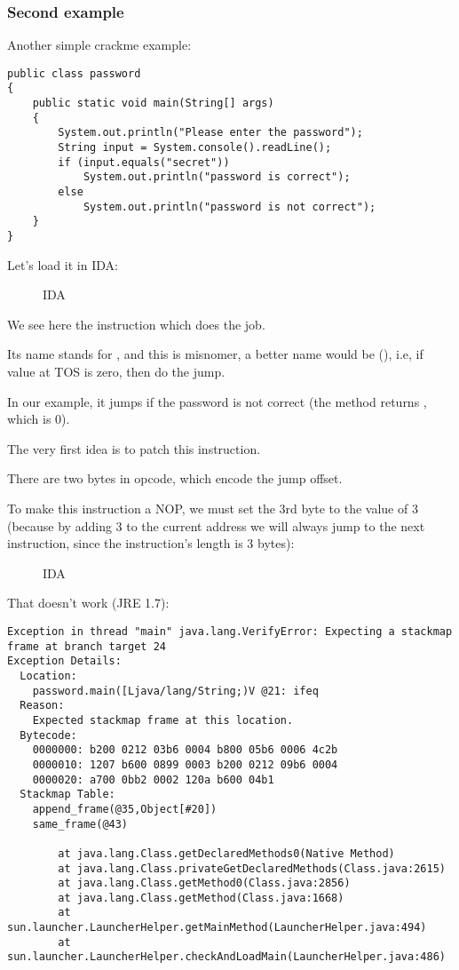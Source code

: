 \subsubsection{Second example}

Another simple crackme example:

\begin{lstlisting}
public class password
{
	public static void main(String[] args)
	{
		System.out.println("Please enter the password");
		String input = System.console().readLine();
		if (input.equals("secret"))
			System.out.println("password is correct");
		else
			System.out.println("password is not correct");
	}
}
\end{lstlisting}

Let's load it in IDA:

\begin{figure}[H]
\centering
{}
\caption{IDA}
\end{figure}

We see here the  instruction which does the job.

Its name stands for , and this is misnomer, a better name would be  (), i.e, 
if value at \ac{TOS} is zero, then do the jump.

In our example, it jumps if the password is not correct 
(the  method returns , which is 0).

The very first idea is to patch this instruction.

There are two bytes in  opcode, which encode the jump offset.

To make this instruction a NOP, we must set the 3rd byte to the value of 3 
(because by adding 3 to the current address we will always jump to the next instruction,
since the  instruction's length is 3 bytes):


\begin{figure}[H]
\centering
{}
\caption{IDA}
\end{figure}

That doesn't work (JRE 1.7):

\begin{lstlisting}
Exception in thread "main" java.lang.VerifyError: Expecting a stackmap frame at branch target 24
Exception Details:
  Location:
    password.main([Ljava/lang/String;)V @21: ifeq
  Reason:
    Expected stackmap frame at this location.
  Bytecode:
    0000000: b200 0212 03b6 0004 b800 05b6 0006 4c2b
    0000010: 1207 b600 0899 0003 b200 0212 09b6 0004
    0000020: a700 0bb2 0002 120a b600 04b1
  Stackmap Table:
    append_frame(@35,Object[#20])
    same_frame(@43)

        at java.lang.Class.getDeclaredMethods0(Native Method)
        at java.lang.Class.privateGetDeclaredMethods(Class.java:2615)
        at java.lang.Class.getMethod0(Class.java:2856)
        at java.lang.Class.getMethod(Class.java:1668)
        at sun.launcher.LauncherHelper.getMainMethod(LauncherHelper.java:494)
        at sun.launcher.LauncherHelper.checkAndLoadMain(LauncherHelper.java:486)
\end{lstlisting}

